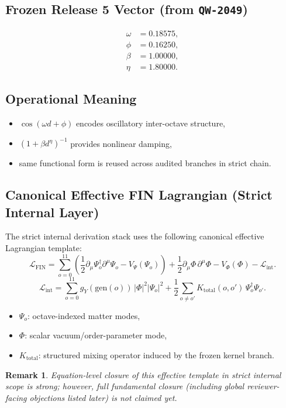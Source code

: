\documentclass[11pt,a4paper]{article}
\newcommand{\QW}[1]{\texttt{QW-#1}}
\newtheorem{remark}{Remark}
\begin{document}
\subsection{Frozen Release 5 Vector (from \QW{2049})}
\begin{align*}
\omega &= 0.18575,\\
\phi &= 0.16250,\\
\beta &= 1.00000,\\
\eta &= 1.80000.
\end{align*}

\subsection{Operational Meaning}
\begin{itemize}[leftmargin=1.4em]
    \item $\cos(\omega d+\phi)$ encodes oscillatory inter-octave structure,
    \item $(1+\beta d^{\eta})^{-1}$ provides nonlinear damping,
    \item same functional form is reused across audited branches in strict chain.
\end{itemize}

\subsection{Canonical Effective FIN Lagrangian (Strict Internal Layer)}
The strict internal derivation stack uses the following canonical effective Lagrangian template:
\begin{equation}
\mathcal{L}_{\mathrm{FIN}}=
\sum_{o=0}^{11}\left(\frac{1}{2}\partial_\mu\Psi_o^\dagger\partial^\mu\Psi_o - V_\Psi(\Psi_o)\right)
+\frac{1}{2}\partial_\mu\Phi\,\partial^\mu\Phi - V_\Phi(\Phi)-\mathcal{L}_{\mathrm{int}}.
\label{eq:fin_lagrangian_full}
\end{equation}
\begin{equation}
\mathcal{L}_{\mathrm{int}}=
\sum_{o=0}^{11} g_Y(\mathrm{gen}(o))\,|\Phi|^2|\Psi_o|^2
+\frac{1}{2}\sum_{o\neq o'}K_{\mathrm{total}}(o,o')\,\Psi_o^\dagger\Psi_{o'}.
\label{eq:fin_lagrangian_interaction}
\end{equation}
\begin{itemize}[leftmargin=1.4em]
    \item $\Psi_o$: octave-indexed matter modes,
    \item $\Phi$: scalar vacuum/order-parameter mode,
    \item $K_{\mathrm{total}}$: structured mixing operator induced by the frozen kernel branch.
\end{itemize}
\begin{remark}
Equation-level closure of this effective template in strict internal scope is strong; however, full fundamental closure (including global reviewer-facing objections listed later) is not claimed yet.
\end{remark}
\end{document}
